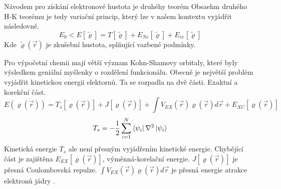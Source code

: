 \documentclass[
  digital, %
  table,   %
  lof,     %
  lot,     %
  oneside,
]{fithesis3}
\begin{document}
Návodem pro získání elektronové hustota je druhéhy teorém Obsaehm druhého H-K teorému je tedy variační princip, který lze v našem kontextu vyjádřit následovně.
\begin{equation}
E_0 < E [\tilde{\varrho}] = T[\tilde{\varrho}] + E_{Ne}[\tilde{\varrho}] + E_{ee}[\tilde{\varrho}]
\end{equation}
Kde $\tilde{\varrho}(\vec{r})$ je zkušební hustota, splňující vazbené podmínky.

 Pro výpočetní chemii mají větší význam Kohn-Shamovy orbitaly, které byly výsledkem geniální myšlenky o rozdělení funkcionálu. Obecně je největší problém vyjádřit kinetickou energii elektornů. Ta se rozpadla na dvě části. Exaktní a korekční část.
\begin{equation}
E(\varrho(\vec{r})) = T_s[\varrho(\vec{r})] + J[\varrho(\vec{r})] + \int V_{EX}(\vec{r})\varrho(\vec{r})d\vec{r} + E_{XC}[\varrho(\vec{r})]
\end{equation}
 \cite{jensen2007introduction}\cite{koch2000chemist}
 \begin{equation}
 T_s = -\frac{1}{2} \sum_{i=1}^{N}  \bra{\psi_i}{\nabla^{2}}\ket{\psi_i}
 \label{kineticka_energie_jednoelektronova}
 \end{equation}
 Kinetická energie $T_s$ ale není přesným vyjádřením kinetické energie. Chybějící část je zajištěna $E_{EX}[\varrho(\vec{r})]$, výměnná-korelační energie. $J[\varrho(\vec{r})]$ je přesná Coulombovská repulze. $\int V_{EX}(\vec{r})\varrho(\vec{r})d\vec{r}$ je přesná energie atrakce elektronů jádry \cite{parr1994density}.
\end{document}
